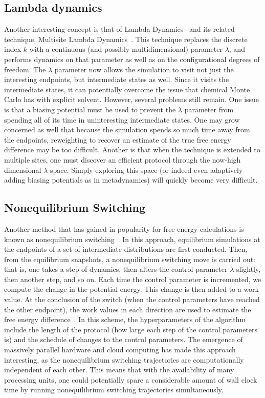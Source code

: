 \subsection{Lambda dynamics}
%
Another interesting concept is that of Lambda Dynamics~\cite{Knight2009} and its related technique, Multisite Lambda Dynamics~\cite{Knight2011, Ding2017}. 
%
This technique replaces the discrete index $k$ with a continuous (and possibly multidimensional) parameter $\lambda$, and performs dynamics on that parameter as well as on the configurational degrees of freedom.
%
The $\lambda$ parameter now allows the simulation to visit not just the interesting endpoints, but intermediate states as well.
%
Since it visits the intermediate states, it can potentially overcome the issue that chemical Monte Carlo has with explicit solvent.
%
However, several problems still remain.
%
One issue is that a biasing potential must be used to prevent the $\lambda$ parameter from spending all of its time in uninteresting intermediate states.
%
One may grow concerned as well that because the simulation spends so much time away from the endpoints, reweighting to recover an estimate of the true free energy difference may be too difficult.
%
Another is that when the technique is extended to multiple sites, one must discover an efficient protocol through the now-high dimensional $\lambda$ space. 
%
Simply exploring this space (or indeed even adaptively adding biasing potentials as in metadynamics) will quickly become very difficult.
%
\subsection{Nonequilibrium Switching}
%
Another method that has gained in popularity for free energy calculations is known as nonequilibrium switching~\cite{Aldeghi2018, Hummer2001, Neal2001}.
%
In this approach, equilibrium simulations at the endpoints of a set of intermediate distributions are first conducted.
%
Then, from the equilibrium snapshots, a nonequilibrium switching move is carried out: that is, one takes a step of dynamics, then alters the control parameter $\lambda$ slightly, then another step, and so on.
%
Each time the control parameter is incremented, we compute the change in the potential energy. This change is then added to a work value.
%
At the conclusion of the switch (when the control parameters have reached the other endpoint), the work values in each direction are used to estimate the free energy difference~\cite{Neal2001,Hummer2001,Aldeghi2018, dellago2014}.
%
In this scheme, the hyperparameters of the algorithm include the length of the protocol (how large each step of the control parameters is) and the schedule of changes to the control parameters.
%
The emergence of massively parallel hardware and cloud computing has made this approach interesting, as the nonequilibrium switching trajectories are computationally independent of each other.
%
This means that with the availability of many processing units, one could potentially spare a considerable amount of wall clock time by running nonequilibrium switching trajectories simultaneously.
%
